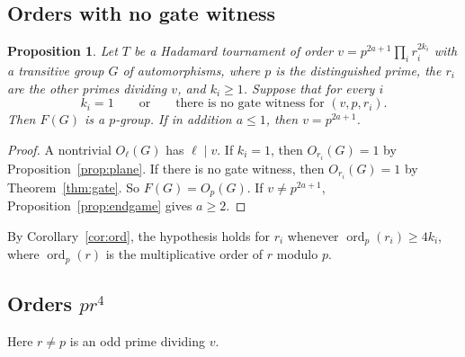 \documentclass[11pt]{amsart}
\newtheorem{proposition}[theorem]{Proposition}
\theoremstyle{definition}
\theoremstyle{remark}
\begin{document}
\subsection{Orders with no gate witness}
\begin{proposition}\label{thm:fittingclass}
Let $T$ be a Hadamard tournament of order $v=p^{2a+1}\prod_ir_i^{2k_i}$ with a transitive group $G$ of automorphisms, where $p$ is the distinguished prime, the $r_i$ are the other primes dividing $v$, and $k_i\ge1$. Suppose that for every $i$
\[
k_i=1\qquad\text{or}\qquad\text{there is no gate witness for }(v,p,r_i).
\]
Then $F(G)$ is a $p$-group. If in addition $a\le1$, then $v=p^{2a+1}$.
\end{proposition}
\begin{proof}
A nontrivial $O_\ell(G)$ has $\ell\mid v$. If $k_i=1$, then $O_{r_i}(G)=1$ by Proposition~\ref{prop:plane}. If there is no gate witness, then $O_{r_i}(G)=1$ by Theorem~\ref{thm:gate}. So $F(G)=O_p(G)$. If $v\ne p^{2a+1}$, Proposition~\ref{prop:endgame} gives $a\ge2$.
\end{proof}

By Corollary~\ref{cor:ord}, the hypothesis holds for $r_i$ whenever $\operatorname{ord}_p(r_i)\ge4k_i$, where $\operatorname{ord}_p(r)$ is the multiplicative order of $r$ modulo $p$.

\subsection{Orders \texorpdfstring{$pr^4$}{p r\^{}4}}
Here $r\ne p$ is an odd prime dividing $v$.
\end{document}
